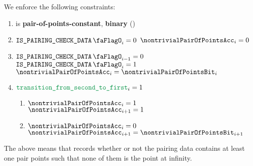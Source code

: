 
We enforce the following constraints:
\begin{enumerate}
    \item \nontrivialPairOfPointsAcc{} is \textbf{pair-of-points-constant}, \textbf{binary} \quad (\trash)
    \item \If $\isBlsPairingCheckData _{i} = 0$ \Then $\nontrivialPairOfPointsAcc _{i} = 0$
    \item \If $\isBlsPairingCheckData _{i - 1} = 0$ \et $\isBlsPairingCheckData _{i} = 1$ \Then $\nontrivialPairOfPointsAcc _{i} = \nontrivialPairOfPointsBit _{i}$
    \item
        \label{bls: setting trivial: transition from large to small}
        \If $\locTransitionFromSecondToFirst _{i} = 1$ \Then
          \begin{enumerate}
              \item \If $\nontrivialPairOfPointsAcc _{i} = 1$ \Then $\nontrivialPairOfPointsAcc _{i + 1} = 1$
              \item \If $\nontrivialPairOfPointsAcc _{i} = 0$ \Then $\nontrivialPairOfPointsAcc _{i + 1} = \nontrivialPairOfPointsBit _{i + 1}$
          \end{enumerate}
\end{enumerate}
\saNote{} The above means that \nontrivialPairOfPointsAcc{} records whether or not the pairing data contains at least one pair points such that none of them is the point at infinity.

